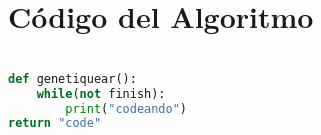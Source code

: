 \documentclass[10pt]{article}
\begin{document}
\section{Código del Algoritmo}
\begin{lstlisting}[language=Python]

def genetiquear():
	while(not finish):
		print("codeando")
return "code"

\end{lstlisting}
\newpage
\tableofcontents
\end{document}

